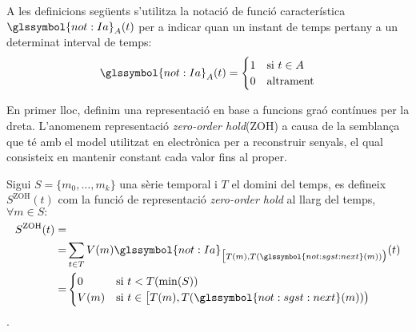 A les definicions següents s'utilitza la notació de funció
característica $\glssymbol{not:Ia}_A(t)$ per a indicar quan un instant
de temps pertany a un determinat interval de temps:
\[
\glssymbol{not:Ia}_A(t) = 
   \begin{cases}
      1 & \text{si } t\in A \\
      0 & \text{altrament}
    \end{cases}
\]



En primer lloc, definim una representació en base a funcions graó
contínues per la dreta. L'anomenem representació \emph{zero-order
  hold}(ZOH) a causa de la semblança que té amb el model utilitzat en
electrònica per a reconstruir senyals, el qual consisteix en mantenir
constant cada valor fins al proper.
\begin{definition}
  \label{def:sgst:zoh}
  Sigui $S=\{m_0,\ldots,m_k\}$ una sèrie temporal i $T$ el domini del
  temps, es defineix $S^\text{ZOH}(t)$ com la funció de representació
  \emph{zero-order hold} al llarg del temps, $\forall m \in S:$
  \begin{align*}
    S^\text{ZOH}(t) = &  \\
    = & \sum_{t\in T} V(m) \glssymbol{not:Ia}_{\big[T(m), T(\glssymbol{not:sgst:next}(m)) \big)}(t)\\
    = & \begin{cases}
      0 & \text{si }  t<T(\min(S)) \\
      V(m) & \text{si } t\in
      \big[T(m),T(\glssymbol{not:sgst:next}(m))\big)
    \end{cases}
         \end{align*}.
\end{definition}



